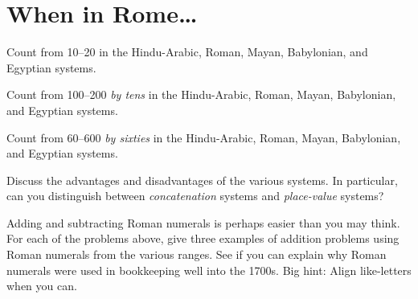 \newpage
\section{When in Rome\dots}

\begin{prob}
Count from 10--20 in the Hindu-Arabic, Roman, Mayan, Babylonian, and
Egyptian systems.
\end{prob}

\begin{prob}
Count from 100--200 \textit{by tens} in the Hindu-Arabic, Roman,
Mayan, Babylonian, and Egyptian systems.
\end{prob}

\begin{prob}
Count from 60--600 \textit{by sixties} in the Hindu-Arabic, Roman,
Mayan, Babylonian, and Egyptian systems.
\end{prob}

\begin{prob}
Discuss the advantages and disadvantages of the various systems. In
particular, can you distinguish between \textit{concatenation}
systems and \textit{place-value} systems?
\end{prob}

\begin{prob}
Adding and subtracting Roman numerals is perhaps easier than you may
think. For each of the problems above, give three examples of addition
problems using Roman numerals from the various ranges. See if you can
explain why Roman numerals were used in bookkeeping well into the
1700s. Big hint: Align like-letters when you can.
\end{prob}






